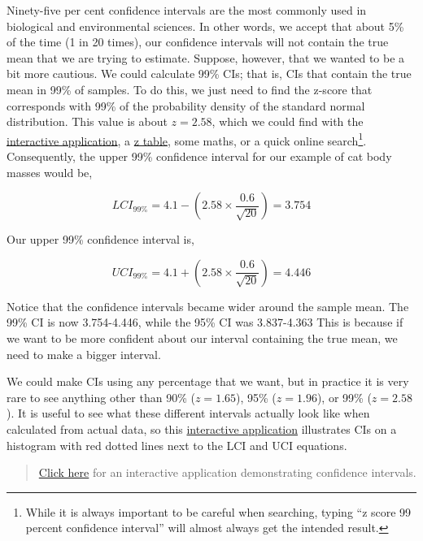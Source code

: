 \documentclass[
]{scrbook}
\begin{document}
Ninety-five per cent confidence intervals are the most commonly used in biological and environmental sciences.
In other words, we accept that about 5\% of the time (1 in 20 times), our confidence intervals will not contain the true mean that we are trying to estimate.
Suppose, however, that we wanted to be a bit more cautious.
We could calculate 99\% CIs; that is, CIs that contain the true mean in 99\% of samples.
To do this, we just need to find the z-score that corresponds with 99\% of the probability density of the standard normal distribution.
This value is about \(z = 2.58\), which we could find with the \href{https://bradduthie.shinyapps.io/zandp/}{interactive application}, a \href{https://www.z-table.com/}{z table}, some maths, or a quick online search\footnote{While it is always important to be careful when searching, typing ``z score 99 percent confidence interval'' will almost always get the intended result.}.
Consequently, the upper 99\% confidence interval for our example of cat body masses would be,

\[LCI_{99\%} = 4.1 - \left(2.58 \times \frac{0.6}{\sqrt{20}}\right) = 3.754\]

Our upper 99\% confidence interval is,

\[UCI_{99\%} = 4.1 + \left(2.58 \times \frac{0.6}{\sqrt{20}}\right) = 4.446\]

Notice that the confidence intervals became wider around the sample mean.
The 99\% CI is now 3.754-4.446, while the 95\% CI was 3.837-4.363
This is because if we want to be more confident about our interval containing the true mean, we need to make a bigger interval.

We could make CIs using any percentage that we want, but in practice it is very rare to see anything other than 90\% (\(z = 1.65\)), 95\% (\(z = 1.96\)), or 99\% (\(z = 2.58\)).
It is useful to see what these different intervals actually look like when calculated from actual data, so this \href{https://bradduthie.shinyapps.io/CI_hist_app/}{interactive application} illustrates CIs on a histogram with red dotted lines next to the LCI and UCI equations.

\begin{quote}
\href{https://bradduthie.shinyapps.io/CI_hist_app/}{Click here} for an interactive application demonstrating confidence intervals.
\end{quote}
\end{document}
